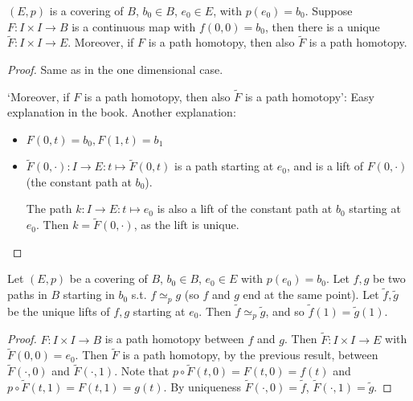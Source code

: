 \begin{lemma}[54.2]
    $(E, p)$ is a covering of  $B$, $b_0 \in B$, $e_0 \in E$, with $p(e_0) = b_0$.
    Suppose $F: I \times I \to  B$ is a continuous map with $f(0, 0) = b_0$, then there is a unique $\tilde F: I \times I \to E.$
    Moreover, if $F$ is a path homotopy, then also $\tilde F$ is a path homotopy.
\end{lemma}
\begin{proof}
    Same as in the one dimensional case.
    \begin{figure}[H]
        \centering
        \label{fig:lift-of-a-path-homotopy}
    \end{figure}

    `Moreover, if $F$ is a path homotopy, then also $\tilde F$ is a path homotopy': Easy explanation in the book. Another explanation:

\begin{figure}[H]
    \centering
    \label{fig:lift-of-path-homotopy-2}
\end{figure}
\begin{itemize}
    \item $F(0, t) = b_0, F(1, t) = b_1$
    \item $\tilde F (0, \cdot ) : I \to  E: t \mapsto  \tilde F(0, t)$ is a path starting at $e_0$,
        and is a lift of $F(0, \cdot )$ (the constant path at $b_0$).

        The path $k: I \to  E: t \mapsto  e_0$ is also a lift of the constant path at $b_0$ starting at $e_0$.
        Then $k = \tilde F(0, \cdot )$, as the lift is unique.
\end{itemize}
\end{proof}


\begin{theorem}[54.3]
    Let $(E, p)$ be a covering of $B$, $b_0 \in B$, $e_0 \in E$ with $p(e_0) = b_0$.
    Let $f, g$ be two paths in $B$ starting in $b_0$ s.t. $f \simeq_p  g$ (so $f$ and $g$ end at the same point).
    Let $\tilde f, \tilde g$ be the unique lifts of $f, g$ starting at $e_0$.
    Then $\tilde f \simeq_p  \tilde g$, and so $\tilde f(1) = \tilde g(1)$.
\end{theorem}
\begin{proof}
    $F: I\times I \to  B$ is a path homotopy between $f$ and $g$.
    Then $\tilde F: I \times I \to  E$ with $\tilde F( 0, 0) = e_0$.
    Then $\tilde F$ is a path homotopy, by the previous result, between $\tilde F(\cdot , 0)$ and $\tilde F(\cdot , 1)$.
    Note that $p  \circ  \tilde F(t, 0) = F(t, 0) = f(t)$ and $p  \circ  \tilde F (t, 1) = F(t, 1) = g(t)$.
    By uniqueness $\tilde F(\cdot, 0) = \tilde f$, $\tilde F(\cdot , 1) = \tilde g$.

\end{proof}


